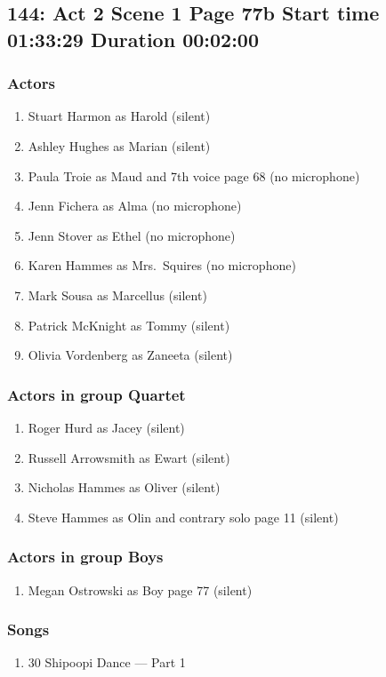 \subsection{144: Act 2 Scene 1 Page 77b Start time 01:33:29 Duration 00:02:00}

\subsubsection{Actors}
\begin{enumerate}
\item Stuart Harmon as Harold (silent)
\item Ashley Hughes as Marian (silent)
\item Paula Troie as Maud and 7th voice page 68 (no microphone)
\item Jenn Fichera as Alma (no microphone)
\item Jenn Stover as Ethel (no microphone)
\item Karen Hammes as Mrs.~Squires (no microphone)
\item Mark Sousa as Marcellus (silent)
\item Patrick McKnight as Tommy (silent)
\item Olivia Vordenberg as Zaneeta (silent)
\end{enumerate}
\subsubsection{Actors in group Quartet}
\begin{enumerate}
\item Roger Hurd as Jacey (silent)
\item Russell Arrowsmith as Ewart (silent)
\item Nicholas Hammes as Oliver (silent)
\item Steve Hammes as Olin and contrary solo page 11 (silent)
\end{enumerate}
\subsubsection{Actors in group Boys}
\begin{enumerate}
\item Megan Ostrowski as Boy page 77 (silent)
\end{enumerate}

\subsubsection{Songs}
\begin{enumerate}
\item 30 Shipoopi Dance --- Part 1
\end{enumerate}
